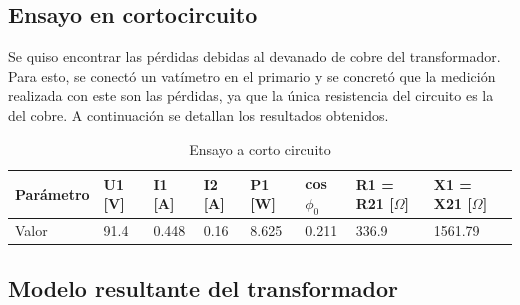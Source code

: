 \documentclass[a4paper]{article}
\begin{document}


\subsection{Ensayo en cortocircuito}
Se quiso encontrar las pérdidas debidas al devanado de cobre del transformador. Para esto, se conectó un vatímetro en el primario y se concretó que la medición realizada con este son las pérdidas, ya que la única resistencia del circuito es la del cobre. A continuación se detallan los resultados obtenidos.
\begin{table}[H]
\centering
\begin{tabular}{|l|l|l|l|l|l|l|l|}
\hline
Parámetro & U1 [V] & I1 [A] & I2 [A] & P1 [W] & cos $\phi_0$  & R1 = R21 [$\Omega$] & X1 = X21 [$\Omega$] \\ \hline
Valor     & 91.4     & 0.448    & 0.16     & 8.625    & 0.211            & 336.9               & 1561.79             \\ \hline
\end{tabular}
\caption {Ensayo a corto circuito}
\centering
\end{table}
\subsection{Modelo resultante del transformador}
\end{document}
